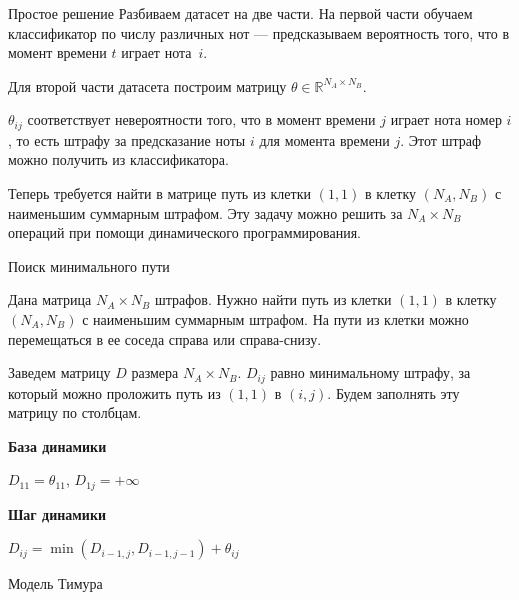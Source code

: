 \documentclass[unicode, dvipsnames]{beamer}
\begin{document}
\begin{frame}{Простое решение}
	Разбиваем датасет на две части.
	На первой части обучаем классификатор по числу различных нот --- предсказываем вероятность того, что в момент времени $t$ играет нота~$i$.
	
	\bigskip
	Для второй части датасета построим матрицу $\theta \in \mathds{R}^{N_A \times N_B}$. 
	
	$\theta_{ij}$ соответствует невероятности того, что в момент времени $j$ играет нота номер $i$, то есть штрафу за предсказание ноты $i$ для момента времени $j$. Этот штраф можно получить из классификатора.
	
	\bigskip
	Теперь требуется найти в матрице путь из клетки $(1, 1)$ в клетку $(N_A, N_B)$ с наименьшим суммарным штрафом. Эту задачу можно решить за $N_A \times N_B$ операций при помощи динамического программирования.
	
\end{frame}

\begin{frame}{Поиск минимального пути}

Дана матрица $N_A \times N_B$ штрафов. Нужно найти путь из клетки $(1, 1)$ в клетку $(N_A, N_B)$ с наименьшим суммарным штрафом. На пути из клетки можно перемещаться в ее соседа справа или справа-снизу.

\bigskip
Заведем матрицу $D$ размера $N_A \times N_B$. $D_{ij}$ равно минимальному штрафу, за который можно проложить путь из $(1, 1)$ в $(i, j)$. Будем заполнять эту матрицу по столбцам.

\bigskip
\textbf{База динамики}

$D_{11} = \theta_{11}$, $D_{1j} = +\infty$

\bigskip
\textbf{Шаг динамики}

$D_{ij} = \min(D_{i-1, j}, D_{i-1, j-1}) + \theta_{ij}$

\end{frame}

\begin{frame}{Модель Тимура}

\end{frame}
\end{document}

